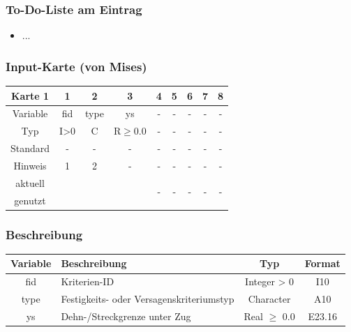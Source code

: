 \documentclass[11pt,titlepage,listof=totoc,bibliography=totoc,twoside]{scrreprt}
\begin{document}
{{\subsubsection{To-Do-Liste am Eintrag}

\begin{itemize}
\item ...
\end{itemize}

\newpage

\subsubsection{Input-Karte (von Mises)}

\begin{table}[htbp]
\centering
\begin{tabularx}{\textwidth}{cCCCcCCCC}
\toprule
Karte 1	& 1		& 2		& 3		& 4			& 5		& 6		& 7		& 8	\\
\midrule
Variable& fid		& type		& ys		& -			& -		& -		& -		& -	\\
Typ	& I>0		& C		& R$\ge$0.0	& -			& -		& -		& -		& -	\\
Standard& -		& -		& -		& -			& -		& -		& -		& -	\\
Hinweis	& 1		& 2		& -		& -			& -		& -		& -		& -	\\
aktuell	& 	& 	& 	& 	& 	& \multirow{2}{*}{-}	& 	& 	\\
genutzt \\
\bottomrule
\end{tabularx}
\end{table}

\subsubsection{Beschreibung}

\begin{tabularx}{\textwidth}{cXcc}
\toprule
Variable& Beschreibung														& Typ			& Format\\
\midrule
fid	& Kriterien-ID														& Integer > 0		& I10	\\
type	& Festigkeits- oder Versagenskriteriumstyp										& Character		& A10	\\
ys	& Dehn-/Streckgrenze unter Zug												& Real $\ge$ 0.0	& E23.16\\
\bottomrule
\end{tabularx}

}}
\end{document}
